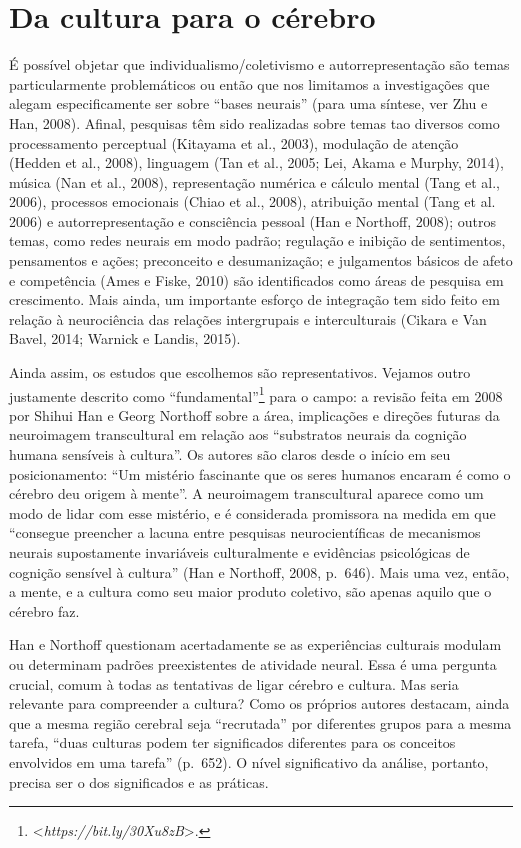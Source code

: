 \section{Da cultura para o cérebro}

É possível objetar que individualismo/coletivismo e autorrepresentação
são temas particularmente problemáticos ou então que nos limitamos a
investigações que alegam especificamente ser sobre ``bases neurais''
(para uma síntese, ver Zhu e Han, 2008). Afinal, pesquisas têm sido
realizadas sobre temas tao diversos como processamento perceptual
(Kitayama et al., 2003), modulação de atenção (Hedden et al., 2008),
linguagem (Tan et al., 2005; Lei, Akama e Murphy, 2014), música (Nan et
al., 2008), representação numérica e cálculo mental (Tang et al., 2006),
processos emocionais (Chiao et al., 2008), atribuição mental (Tang et
al. 2006) e autorrepresentação e consciência pessoal (Han e Northoff,
2008); outros temas, como redes neurais em modo padrão; regulação e
inibição de sentimentos, pensamentos e ações; preconceito e
desumanização; e julgamentos básicos de afeto e competência (Ames e
Fiske, 2010) são identificados como áreas de pesquisa em crescimento.
Mais ainda, um importante esforço de integração tem sido feito em
relação à neurociência das relações intergrupais e interculturais
(Cikara e Van Bavel, 2014; Warnick e Landis, 2015).

Ainda assim, os estudos que escolhemos são representativos. Vejamos
outro justamente descrito como ``fundamental''\footnote[12]{\textless{}\emph{https://bit.ly/30Xu8zB}\textgreater{}.} para
o campo: a revisão feita em 2008 por Shihui Han e Georg Northoff sobre a
área, implicações e direções futuras da neuroimagem transcultural em
relação aos ``substratos neurais da cognição humana sensíveis à
cultura''. Os autores são claros desde o início em seu posicionamento:
``Um mistério fascinante que os seres humanos encaram é como o cérebro
deu origem à mente''. A neuroimagem transcultural aparece como um modo
de lidar com esse mistério, e é considerada promissora na medida em que
``consegue preencher a lacuna entre pesquisas neurocientíficas de
mecanismos neurais supostamente invariáveis culturalmente e evidências
psicológicas de cognição sensível à cultura'' (Han e Northoff, 2008,
p.~646). Mais uma vez, então, a mente, e a cultura como seu maior produto
coletivo, são apenas aquilo que o cérebro faz.

Han e Northoff questionam acertadamente se as experiências culturais
modulam ou determinam padrões preexistentes de atividade neural. Essa é
uma pergunta crucial, comum à todas as tentativas de ligar cérebro e
cultura. Mas seria relevante para compreender a cultura? Como os
próprios autores destacam, ainda que a mesma região cerebral seja
``recrutada'' por diferentes grupos para a mesma tarefa, ``duas culturas
podem ter significados diferentes para os conceitos envolvidos em uma
tarefa'' (p.~652). O nível significativo da análise, portanto, precisa
ser o dos significados e as práticas.

